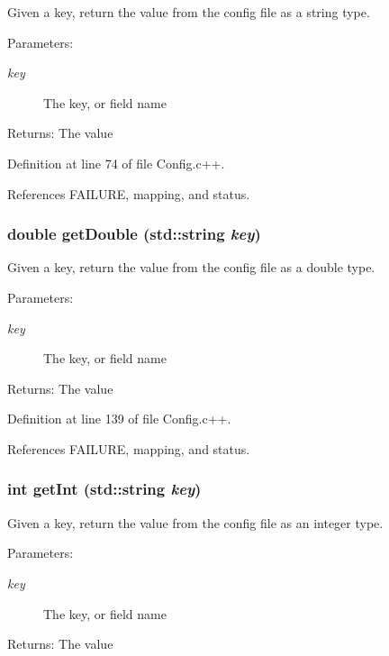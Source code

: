 Given a key, return the value from the config file as a string type.

\begin{Desc}
\item[Parameters:]
\begin{description}
\item[{\em key}]The key, or field name \end{description}
\end{Desc}
\begin{Desc}
\item[Returns:]The value \end{Desc}


Definition at line 74 of file Config.c++.

References FAILURE, mapping, and status.
\subsubsection{\setlength{\rightskip}{0pt plus 5cm}double get\-Double (std::string {\em key})}\label{classConfig_2041a0bdf570d8b82b91dca5f0b17c3d}


Given a key, return the value from the config file as a double type.

\begin{Desc}
\item[Parameters:]
\begin{description}
\item[{\em key}]The key, or field name \end{description}
\end{Desc}
\begin{Desc}
\item[Returns:]The value \end{Desc}


Definition at line 139 of file Config.c++.

References FAILURE, mapping, and status.
\subsubsection{\setlength{\rightskip}{0pt plus 5cm}int get\-Int (std::string {\em key})}\label{classConfig_4172b0cb885929c29e77d77b37231774}


Given a key, return the value from the config file as an integer type.

\begin{Desc}
\item[Parameters:]
\begin{description}
\item[{\em key}]The key, or field name \end{description}
\end{Desc}
\begin{Desc}
\item[Returns:]The value \end{Desc}



